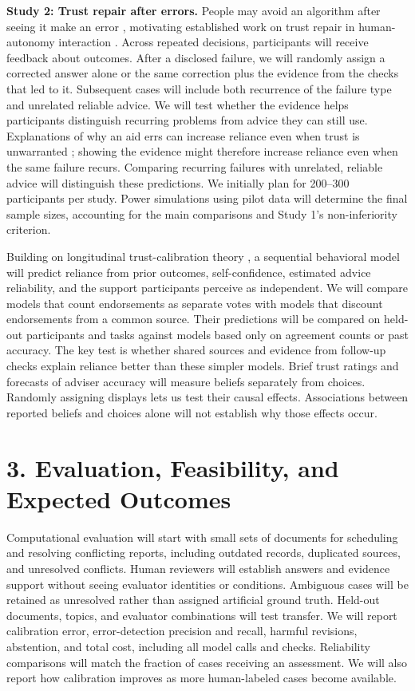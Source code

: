 \documentclass[12pt]{article}
\begin{document}
\textbf{Study 2: Trust repair after errors.} People may avoid an algorithm after seeing it make an error \citep{dietvorst2015algorithm}, motivating established work on trust repair in human-autonomy interaction \citep{devisser2018repair,lyons2021hat}. Across repeated decisions, participants will receive feedback about outcomes. After a disclosed failure, we will randomly assign a corrected answer alone or the same correction plus the evidence from the checks that led to it. Subsequent cases will include both recurrence of the failure type and unrelated reliable advice. We will test whether the evidence helps participants distinguish recurring problems from advice they can still use. Explanations of why an aid errs can increase reliance even when trust is unwarranted \citep{dzindolet2003role}; showing the evidence might therefore increase reliance even when the same failure recurs. Comparing recurring failures with unrelated, reliable advice will distinguish these predictions. We initially plan for 200--300 participants per study. Power simulations using pilot data will determine the final sample sizes, accounting for the main comparisons and Study 1's non-inferiority criterion.

Building on longitudinal trust-calibration theory \citep{devisser2020longitudinal}, a sequential behavioral model will predict reliance from prior outcomes, self-confidence, estimated advice reliability, and the support participants perceive as independent. We will compare models that count endorsements as separate votes with models that discount endorsements from a common source. Their predictions will be compared on held-out participants and tasks against models based only on agreement counts or past accuracy. The key test is whether shared sources and evidence from follow-up checks explain reliance better than these simpler models. Brief trust ratings and forecasts of adviser accuracy will measure beliefs separately from choices. Randomly assigning displays lets us test their causal effects. Associations between reported beliefs and choices alone will not establish why those effects occur.

\section*{3. Evaluation, Feasibility, and Expected Outcomes}

Computational evaluation will start with small sets of documents for scheduling and resolving conflicting reports, including outdated records, duplicated sources, and unresolved conflicts. Human reviewers will establish answers and evidence support without seeing evaluator identities or conditions. Ambiguous cases will be retained as unresolved rather than assigned artificial ground truth. Held-out documents, topics, and evaluator combinations will test transfer. We will report calibration error, error-detection precision and recall, harmful revisions, abstention, and total cost, including all model calls and checks. Reliability comparisons will match the fraction of cases receiving an assessment. We will also report how calibration improves as more human-labeled cases become available.
\end{document}
